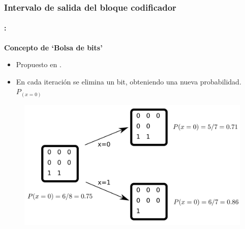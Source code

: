 \begin{frame}
  \frametitle{\textbf{Intervalo de salida del bloque codificador}}
\framesubtitle{\secname : \subsecname}
   \begin{block}{\centering \textbf{Concepto de `Bolsa de bits'}}
   \begin{itemize}
    \item Propuesto en \cite[Sec.\ 4]{schulte}.
    \item En cada iteración se elimina un bit, obteniendo una nueva probabilidad. $P_{(x=0)}$ 
    \end{itemize}
  \end{block}
      \vspace{-0.3cm}
  \begin{figure}[!t] \centering
  \includegraphics[width=0.70\paperwidth]{Diagramas/bag.png}%
  \end{figure}
\end{frame}

